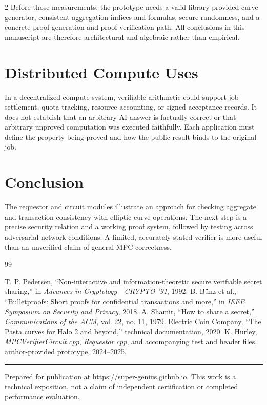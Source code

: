 \documentclass[10pt,letterpaper]{article}
\begin{document}
\begin{multicols}{2}
Before those measurements, the prototype needs a valid library-provided curve generator, consistent aggregation indices and formulas, secure randomness, and a concrete proof-generation and proof-verification path. All conclusions in this manuscript are therefore architectural and algebraic rather than empirical.

\section{Distributed Compute Uses}
In a decentralized compute system, verifiable arithmetic could support job settlement, quota tracking, resource accounting, or signed acceptance records. It does not establish that an arbitrary AI answer is factually correct or that arbitrary unproved computation was executed faithfully. Each application must define the property being proved and how the public result binds to the original job.

\section{Conclusion}
The requestor and circuit modules illustrate an approach for checking aggregate and transaction consistency with elliptic-curve operations. The next step is a precise security relation and a working proof system, followed by testing across adversarial network conditions. A limited, accurately stated verifier is more useful than an unverified claim of general MPC correctness.

\end{multicols}
\vspace{6pt}
\begin{thebibliography}{99}

 T. P. Pedersen, ``Non-interactive and information-theoretic secure verifiable secret sharing,'' in \emph{Advances in Cryptology---CRYPTO '91}, 1992.
 B. B\"unz et al., ``Bulletproofs: Short proofs for confidential transactions and more,'' in \emph{IEEE Symposium on Security and Privacy}, 2018.
 A. Shamir, ``How to share a secret,'' \emph{Communications of the ACM}, vol. 22, no. 11, 1979.
 Electric Coin Company, ``The Pasta curves for Halo 2 and beyond,'' technical documentation, 2020.
 K. Hurley, \emph{MPCVerifierCircuit.cpp}, \emph{Requestor.cpp}, and accompanying test and header files, author-provided prototype, 2024--2025.

\end{thebibliography}
\vspace{8pt}
\noindent\rule{\textwidth}{0.3pt}
\noindent\footnotesize Prepared for publication at \url{https://super-genius.github.io}. This work is a technical exposition, not a claim of independent certification or completed performance evaluation.
\end{document}
